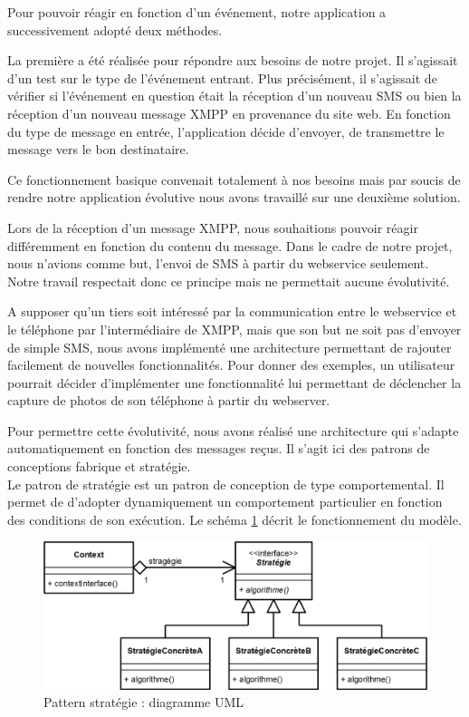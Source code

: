 Pour pouvoir réagir en fonction d'un événement, notre application a successivement adopté deux méthodes.
 
La première a été réalisée pour répondre aux besoins de notre projet. Il s'agissait d'un test sur le 
type de l'événement entrant. Plus précisément, il s'agissait de vérifier si l'événement en question 
était la réception d'un nouveau SMS ou bien la réception d'un nouveau message XMPP en provenance du 
site web. En fonction du type de message en entrée, l'application décide d'envoyer, de  transmettre le message
vers le bon destinataire. 

Ce fonctionnement basique convenait totalement à nos besoins mais par soucis de rendre notre application
évolutive nous avons travaillé sur une deuxième solution.
 
Lors de la réception d'un message XMPP, nous souhaitions pouvoir réagir différemment en fonction du contenu
du message. Dans le cadre de notre projet, nous n'avions comme but, l'envoi de SMS à partir du webservice
seulement. Notre travail respectait donc ce principe mais ne permettait aucune évolutivité.

A supposer qu'un tiers soit intéressé par la communication entre le webservice et le téléphone par 
l'intermédiaire de XMPP, mais que son but ne soit pas d'envoyer de simple SMS, nous avons implémenté une
architecture permettant de rajouter facilement de nouvelles fonctionnalités. Pour donner des exemples, 
un utilisateur pourrait décider d'implémenter une fonctionnalité lui permettant de déclencher la capture
de photos de son téléphone à partir du webserver.
 
Pour permettre cette évolutivité, nous avons réalisé une architecture qui s'adapte automatiquement en
fonction des messages reçus. Il s'agit ici des patrons de conceptions fabrique et stratégie. 
\\
 
 
Le patron de stratégie est un patron de conception de type comportemental. Il permet de d'adopter 
dynamiquement un comportement particulier en fonction des conditions de son exécution. Le schéma 
\ref{pattern_strategie} décrit le fonctionnement du modèle.
 
\begin{figure}[H]
  \center
  \includegraphics[width=12cm]{img/pattern_strategie.png}
  \caption{Pattern stratégie : diagramme UML}
  \label{pattern_strategie}
\end{figure}
 
